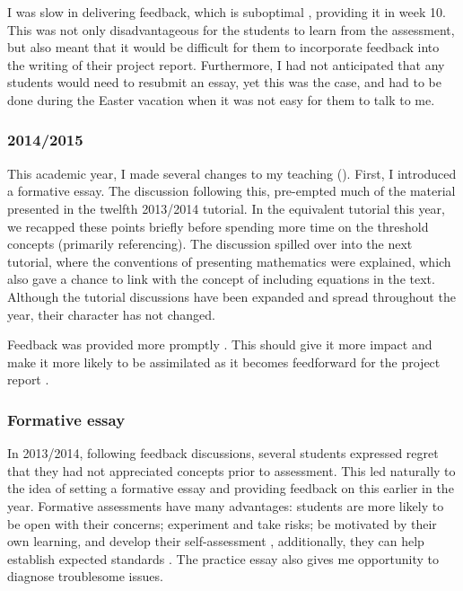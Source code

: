 I was slow in delivering feedback, which is suboptimal \citep[chapter 4, and references therein]{Irons2008}, providing it in week 10. This was not only disadvantageous for the students to learn from the assessment, but also meant that it would be difficult for them to incorporate feedback into the writing of their project report. Furthermore, I had not anticipated that any students would need to resubmit an essay, yet this was the case, and had to be done during the Easter vacation when it was not easy for them to talk to me.

\subsubsection{2014/2015}\label{sec:teach2014-15}

This academic year, I made several changes to my teaching (). First, I introduced a formative essay. The discussion following this, pre-empted much of the material presented in the twelfth 2013/2014 tutorial. In the equivalent tutorial this year, we recapped these points briefly before spending more time on the threshold concepts (primarily referencing). The discussion spilled over into the next tutorial, where the conventions of presenting mathematics were explained, which also gave a chance to link with the concept of including equations in the text. Although the tutorial discussions have been expanded and spread throughout the year, their character has not changed.

Feedback was provided more promptly \citep{Gibbs2015}. This should give it more impact and make it more likely to be assimilated as it becomes feedforward for the project report \citep{Housell2003,Bloxham2015}.

\subsubsection{Formative essay}\label{sec:formative}

In 2013/2014, following feedback discussions, several students expressed regret that they had not appreciated concepts prior to assessment. This led naturally to the idea of setting a formative essay and providing feedback on this earlier in the year. Formative assessments have many advantages: students are more likely to be open with their concerns; experiment and take risks; be motivated by their own learning, and develop their self-assessment \citep[chapter 1, and references therein]{Irons2008}, additionally, they can help establish expected standards \citep[chapter 10]{Ramsden1992}. The practice essay also gives me opportunity to diagnose troublesome issues.


